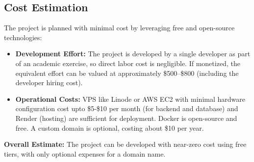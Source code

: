 \subsection*{Cost Estimation}
The project is planned with minimal cost by leveraging free and open-source technologies:
\begin{itemize}
    \item \textbf{Development Effort:} The project is developed by a single developer
      as part of an academic exercise, so direct labor cost is negligible.
      If monetized, the equivalent effort can be valued at approximately \$500--\$800 (including the developer hiring cost).
    \item \textbf{Operational Costs:} VPS like Linode or AWS EC2 with minimal hardware configuration
      cost upto \$5-\$10 per month (for backend and database)  and
      Render (hosting) are sufficient for deployment.
      Docker is open-source and free. A custom domain is optional, costing about \$10 per year.
\end{itemize}

\noindent
\textbf{Overall Estimate:} The project can be developed with near-zero cost using free tiers,
with only optional expenses for a domain name.
